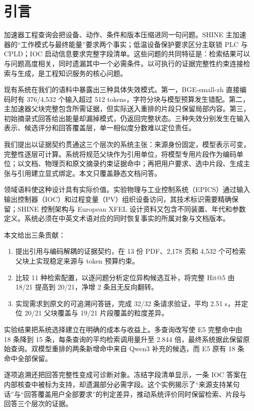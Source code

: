 \section{引言}

加速器工程查询会把设备、动作、条件和版本压缩进同一句问题。SHINE 主加速器的“工作模式与最终能量”要求两个事实；低温设备保护要求区分主联锁 PLC 与 CPLD；IOC 启动信息要求完整字段清单。这些问题的共同特征是：检索结果可以与问题高度相关，同时遗漏其中一个必需条件。以可执行的证据完整性约束连接检索与生成，是工程知识服务的核心问题。

现有系统在我们的语料中暴露出三种具体失效模式。第一，BGE-small-zh 直接编码时有 376/4,532 个输入超过 512 tokens，字符分块与模型预算发生错配。第二，主加速器父块完整包含所需证据，但实际送入重排的片段只保留局部内容。第三，初始摘录式回答给出能量却漏掉模式，仍返回完整状态。三种失效分别发生在输入表示、候选评分和回答覆盖层，单一相似度分数难以定位责任。

我们提出以证据契约贯通这三个层次的系统主张：来源身份固定，模型表示可变，完整性逐层可计算。系统将规范父块作为引用单位，将模型专用片段作为编码单位；以文档、物理页和原文摘录约束证据命中；再把用户要求、选中片段、生成主张与引用建立显式绑定。本文只覆盖静态文档问答。

领域语料使这种设计具有实际价值。实验物理与工业控制系统（EPICS）通过输入输出控制器（IOC）和过程变量（PV）组织设备访问，其技术标识需要精确保留\citep{epics,epicsdocs}；SHINE 控制架构\citep{shinecontrol}与 European XFEL 设计资料\citep{xfel}又包含不同装置、年代和参数定义。系统必须在中英文术语对应的同时恢复事实的所属对象与文档版本。

本文给出三条贡献：
\begin{enumerate}
\item 提出引用与编码解耦的证据契约，在 13 份 PDF、2,178 页和 4,532 个可检索父块上实现稳定来源与 token 预算约束。
\item 比较 11 种检索配置，以逐问题分析定位异构候选互补，将完整 Hit@5 由 18/21 提高到 20/21，净增 2 条且无反向翻转。
\item 实现需求到原文的可追溯问答链，完成 32/32 条请求验证，平均 2.51 s，并定位 20/21 父块覆盖与 19/21 片段覆盖的粒度差异。
\end{enumerate}

实验结果把系统选择建立在明确的成本与收益上。多查询改写使 E5 完整命中由 18 条降到 15 条，每条查询的平均检索调用量升至 2.844 倍，最终系统据此保留原始查询。双模型重排的两条新增命中来自 Qwen3 补充的候选，而 E5 原有 18 条命中全部保留。

逐项追溯还把回答完整性变成可诊断对象。冻结字段清单显示，一条 IOC 答案在内部核查中被标为支持，却遗漏部分必需字段。这个实例揭示了“来源支持某句话”与“回答覆盖用户全部要求”的判定差异，推动系统评价同时保留检索、片段与回答三个层次的证据。
